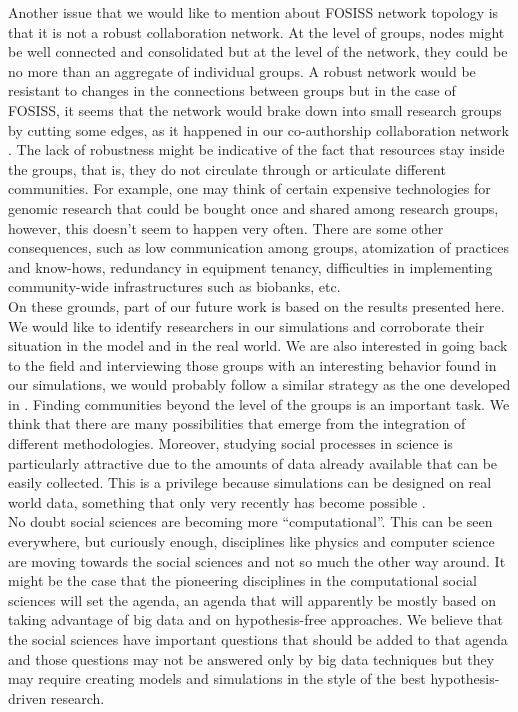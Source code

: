 \documentclass{bmcart}
\begin{document}
  Another issue that we would like to mention about FOSISS network
  topology is that it is not a robust collaboration network.  At the
  level of groups, nodes might be well connected and consolidated but
  at the level of the network, they could be no more than an aggregate
  of individual groups. A robust network would be resistant to changes
  in the connections between groups but in the case of FOSISS, it
  seems that the network would brake down into small research groups
  by cutting some edges, as it happened in our co-authorship
  collaboration network \cite{HernandezLemus:2013}. The lack of
  robustness might be indicative of the fact that resources stay
  inside the groups, that is, they do not circulate through or
  articulate different communities. For example, one may think of
  certain expensive technologies for genomic research that could be
  bought once and shared among research groups, however, this doesn't
  seem to happen very often. There are some other consequences, such
  as low communication among groups, atomization of practices and
  know-hows, redundancy in equipment tenancy, difficulties in
  implementing community-wide infrastructures such as biobanks,
  etc. \\

  On these grounds, part of our future work is based on the results
  presented here. We would like to identify researchers in our
  simulations and corroborate their situation in the model and in the
  real world. We are also interested in going back to the field and
  interviewing those groups with an interesting behavior found in our
  simulations, we would probably follow a similar strategy as the one
  developed in \cite{Hara:2003}. Finding communities beyond the level
  of the groups is an important task. We think that there are many
  possibilities that emerge from the integration of different
  methodologies. Moreover, studying social processes in science is
  particularly attractive due to the amounts of data already available
  that can be easily collected. This is a privilege because
  simulations can be designed on real world data, something that only
  very recently has become possible \cite{Barabasi:2012}.\\


No doubt social sciences are becoming more ``computational''. This can
be seen everywhere, but curiously enough, disciplines like physics
and computer science are moving towards the social
sciences and not so much the other way around. It might be the case
that the pioneering disciplines in the computational social sciences
will set the agenda, an agenda that will apparently be mostly based on
taking advantage of big data and on hypothesis-free approaches. We
believe that the social sciences have important questions that should
be added to that agenda and those questions may not be answered only
by big data techniques but they may require creating models and
simulations in the style of the best hypothesis-driven research.
\end{document}
